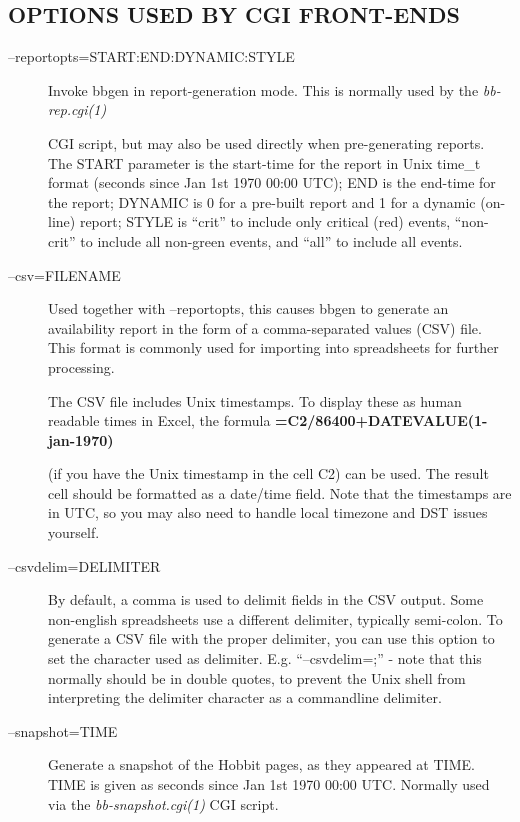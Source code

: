 \subsection{OPTIONS USED BY CGI FRONT-ENDS}
\begin{description}
\item[--reportopts=START:END:DYNAMIC:STYLE] Invoke bbgen in
  report-generation mode. This is normally used by the
  \emph{bb-rep.cgi(1)}

 CGI script, but may also be used directly when pre-generating
 reports. The START parameter is the start-time for the report in Unix
 time\_t format (seconds since Jan 1st 1970 00:00 UTC); END is the
 end-time for the report; DYNAMIC is 0 for a pre-built report and 1
 for a dynamic (on-line) report; STYLE is ``crit'' to include only
 critical (red) events, ``non-crit'' to include all non-green events,
 and ``all'' to include all events. 


 

\item[--csv=FILENAME] Used together with --reportopts, this causes
  bbgen to generate an availability report in the form of a
  comma-separated values (CSV) file. This format is commonly used for
  importing into spreadsheets for further processing.  

 The CSV file includes Unix timestamps. To display these as human
 readable times in Excel, the formula
 \textbf{=C2/86400+DATEVALUE(1-jan-1970)}

 (if you have the Unix timestamp in the cell C2) can be used. The
 result cell should be formatted as a date/time field. Note that the
 timestamps are in UTC, so you may also need to handle local timezone
 and DST issues yourself. 


 

\item[--csvdelim=DELIMITER] By default, a comma is used to delimit
  fields in the CSV output. Some non-english spreadsheets use a
  different delimiter, typically semi-colon. To generate a CSV file
  with the proper delimiter, you can use this option to set the
  character used as delimiter. E.g. ``--csvdelim=;'' - note that this
  normally should be in double quotes, to prevent the Unix shell from
  interpreting the delimiter character as a commandline delimiter. 



\item[--snapshot=TIME] Generate a snapshot of the Hobbit pages, as
  they appeared at TIME. TIME is given as seconds since Jan 1st 1970
  00:00 UTC. Normally used via the \emph{bb-snapshot.cgi(1)} CGI script. 

 


\end{description}
